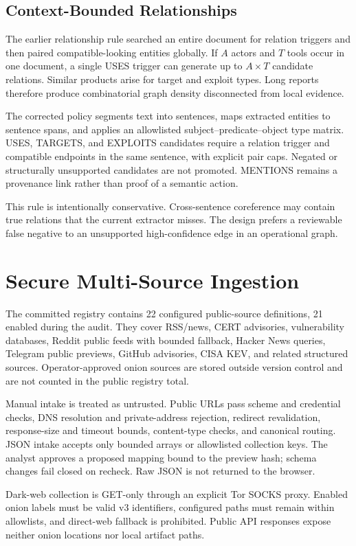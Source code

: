 \documentclass[conference]{IEEEtran}
\begin{document}
\subsection{Context-Bounded Relationships}
The earlier relationship rule searched an entire document for relation triggers and then paired compatible-looking entities globally. If $A$ actors and $T$ tools occur in one document, a single USES trigger can generate up to $A\times T$ candidate relations. Similar products arise for target and exploit types. Long reports therefore produce combinatorial graph density disconnected from local evidence.

The corrected policy segments text into sentences, maps extracted entities to sentence spans, and applies an allowlisted subject--predicate--object type matrix. USES, TARGETS, and EXPLOITS candidates require a relation trigger and compatible endpoints in the same sentence, with explicit pair caps. Negated or structurally unsupported candidates are not promoted. MENTIONS remains a provenance link rather than proof of a semantic action.

This rule is intentionally conservative. Cross-sentence coreference may contain true relations that the current extractor misses. The design prefers a reviewable false negative to an unsupported high-confidence edge in an operational graph.

\section{Secure Multi-Source Ingestion}
The committed registry contains 22 configured public-source definitions, 21 enabled during the audit. They cover RSS/news, CERT advisories, vulnerability databases, Reddit public feeds with bounded fallback, Hacker News queries, Telegram public previews, GitHub advisories, CISA KEV, and related structured sources. Operator-approved onion sources are stored outside version control and are not counted in the public registry total.

Manual intake is treated as untrusted. Public URLs pass scheme and credential checks, DNS resolution and private-address rejection, redirect revalidation, response-size and timeout bounds, content-type checks, and canonical routing. JSON intake accepts only bounded arrays or allowlisted collection keys. The analyst approves a proposed mapping bound to the preview hash; schema changes fail closed on recheck. Raw JSON is not returned to the browser.

Dark-web collection is GET-only through an explicit Tor SOCKS proxy. Enabled onion labels must be valid v3 identifiers, configured paths must remain within allowlists, and direct-web fallback is prohibited. Public API responses expose neither onion locations nor local artifact paths.
\end{document}
